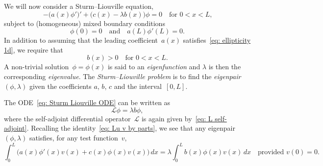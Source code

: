 We will now consider a Sturm--Liouville equation,
\begin{equation}\label{eq: Sturm Liouville ODE}
-\bigl(a(x)\phi'\bigr)'+\bigl(c(x)-\lambda b(x)\bigr)\phi=0\quad
	\text{for $0<x<L$,}
\end{equation}
subject to (homogeneous) mixed boundary conditions
\begin{equation}\label{eq: Sturm Liouville bc}
\phi(0)=0\quad\text{and}\quad a(L)\phi'(L)=0.
\end{equation}
In addition to assuming that the leading coefficient~$a(x)$ 
satisfies~\eqref{eq: ellipticity 1d}, we require that
\begin{equation}\label{eq: b>0}
b(x)>0\quad\text{for $0<x<L$.}
\end{equation}
A non-trivial solution~$\phi=\phi(x)$ is said to an \emph{eigenfunction} and 
$\lambda$ is then the corresponding \emph{eigenvalue}.  The
\emph{Sturm--Liouville problem} is to find the \emph{eigenpair} $(\phi,\lambda)$
given the coefficients $a$, $b$, $c$ and the interval~$[0,L]$.

The ODE~\eqref{eq: Sturm Liouville ODE} can be written as
\[
\mathcal{L}\phi=\lambda b\phi,
\]
where the self-adjoint differential operator~$\mathcal{L}$ is again given 
by~\eqref{eq: L self-adjoint}.  Recalling the 
identity~\eqref{eq: Lu v by parts}, we see that any eigenpair $(\phi,\lambda)$
satisfies, for any test function~$v$,
\[
\int_0^L\bigl(a(x)\phi'(x)v(x)+c(x)\phi(x)v(x)\bigr)\,dx
	=\lambda\int_0^Lb(x)\phi(x)v(x)\,dx
\quad\text{provided $v(0)=0$.}
\]

